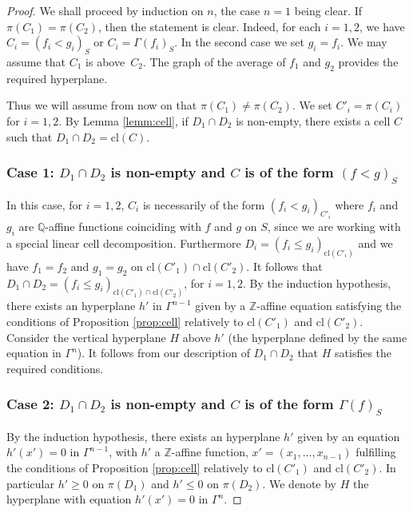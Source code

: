 \documentclass[JEP,XML,SOM,Unicode,ThmDefs,NoEqCountersInSection,published]{cedram}
\newcommand{\cl}{\mathrm{cl}}
\newcommand{\Q}{\mathbb Q}
\newcommand{\Z}{\mathbb Z}
\theoremstyle{plain}
\theoremstyle{definition}
\begin{document}
\begin{proof}We shall proceed by induction on $n$, the case $n=1$ being clear.
If $\pi (C_1) = \pi (C_2)$, then the statement is clear. Indeed, for each $i = 1, 2$, we have
$C_i = (f_i < g_i)_S$ or $C_i = \Gamma(f_i)_S$. In the second case we set $g_i = f_i$.
We may assume that $C_1$ is above~$C_2$. The graph of the average of $f_1$ and $g_2$ provides the required hyperplane.

Thus we will assume from now on that $\pi (C_1) \neq \pi (C_2)$.
We set $C'_i = \pi (C_i)$ for $i = 1, 2$.
By Lemma \ref{lemm:cell}, if $D_1 \cap D_2$ is non-empty, there exists a cell $C$ such that
$D_1 \cap D_2 = \cl (C)$.

\subsubsection*{Case 1: $D_1 \cap D_2$ is non-empty and $C$ is of the form $(f < g)_S$}

In this case, for $i = 1, 2$, $C_i$ is necessarily of the form
$(f_i < g_i)_{C'_i}$ where $f_i$ and $g_i$ are $\Q$-affine functions coinciding with $f$ and $g$ on $S$, since we are working with a special linear cell decomposition.
Furthermore $D_i = (f_i \leq g_i)_{\cl (C'_i)}$ and we have $f_1 = f_2$ and $g_1 = g_2$ on $\cl (C'_1) \cap \cl (C'_2)$.
It follows that $D_1 \cap D_2 =
(f_i \leq g_i)_{\cl (C'_1) \cap \cl (C'_2)}$, for $i = 1,2$.
By the induction hypothesis, there exists an hyperplane $h'$ in $\Gamma^{n-1}$ given by a
$\Z$-affine equation satisfying
the conditions of Proposition \ref {prop:cell} relatively to
$\cl (C'_1)$ and $\cl (C'_2)$. Consider the vertical hyperplane $H$ above $h'$ (the hyperplane defined by the same equation in $\Gamma^n$).
It follows from our description of $D_1 \cap D_2$ that $H$ satisfies the required conditions.

\subsubsection*{Case 2: $D_1 \cap D_2$ is non-empty and $C$ is of the form $\Gamma (f)_S$}

By the induction hypothesis,
there exists an hyperplane $h'$ given by an equation $h' (x')=0$ in $\Gamma^{n-1}$, with $h'$ a $\Z$-affine function, $x'=(x_1,\ldots, x_{n-1})$
fulfilling
the conditions of Proposition \ref {prop:cell} relatively to
$\cl (C'_1)$ and $\cl (C'_2)$.
In particular $h' \geq 0 $ on
$\pi (D_1)$ and $h' \leq 0$ on $\pi (D_2)$.
We denote by $H$ the hyperplane with equation $h'(x')=0$ in $\Gamma^{n}$.\enlargethispage{\baselineskip}%


\end{proof}
\end{document}
